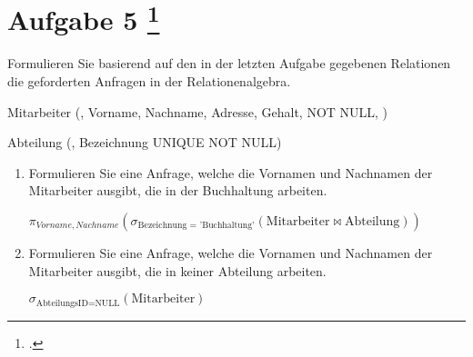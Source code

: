 \documentclass{lehramt-informatik-aufgabe}
\begin{document}
\section{Aufgabe 5
\footcite{66116:2021:03}}

Formulieren Sie basierend auf den in der letzten Aufgabe gegebenen
Relationen die geforderten Anfragen in der Relationenalgebra.

\begin{liRmodell}
Mitarbeiter (, Vorname, Nachname, Adresse,
Gehalt,  NOT NULL, )

\bigskip

Abteilung (, Bezeichnung UNIQUE NOT NULL)
\end{liRmodell}

\begin{enumerate}






\item Formulieren Sie eine Anfrage, welche die Vornamen und Nachnamen
der Mitarbeiter ausgibt, die in der Buchhaltung arbeiten.

\begin{liAntwort}
$\pi_{Vorname, Nachname}(
  \sigma_{\text{Bezeichnung = 'Buchhaltung'}}(
    \text{Mitarbeiter}
    \bowtie
    \text{Abteilung}
  )
)
$
\end{liAntwort}


\item Formulieren Sie eine Anfrage, welche die Vornamen und Nachnamen
der Mitarbeiter ausgibt, die in keiner Abteilung arbeiten.


\begin{liAntwort}
$\sigma_{\text{AbteilungsID} = \text{NULL}}(\text{Mitarbeiter})$
\end{liAntwort}
\end{enumerate}
\end{document}
